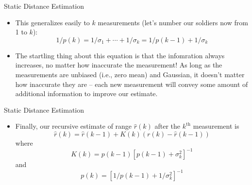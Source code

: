 \begin{frame}
Static Distance Estimation
\begin{itemize}
  \item This generalizes easily to $k$ measurements (let's number our soldiers now from 1 to $k$):
\[1/p(k)=1/\sigma_1 + \cdots + 1/\sigma_{k}=1/p(k-1)+1/\sigma_{k}\]
  \item The startling thing about this equation is that the infomration always increases, no matter how inaccurate the
measurement!  As long as the measurements are unbiased (i.e., zero mean) and Gaussian, it doesn't
 matter how inaccurate they are -- each new measurement will convey some amount of additional information
to improve our estimate.
\end{itemize} 
\end{frame}


\begin{frame}
Static Distance Estimation
\begin{itemize}
  \item Finally, our recursive estimate of range $\hat{r}(k)$ after the $k^\text{th}$ measurement is
\[\hat{r}(k) = \hat{r}(k-1)+ K(k)(r(k) - \hat{r}(k-1))\]
where
\[K(k) = p(k-1)\left[p(k-1)+\sigma_k^2\right]^{-1}\] and
\[p(k)=\left[1/p(k-1) + 1/\sigma_k^2\right]^{-1}\]
\end{itemize} 
\end{frame}

